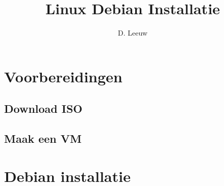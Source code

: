 \documentclass[a4paper,12pt,twoside,openright,titlepage]{article}
\author{D. Leeuw}
\title{Linux Debian Installatie}
\date{\today\\
0.5.1\\
\vfill
\raggedright
\copyright\ 2020-2025 Dennis Leeuw\\
}
\begin{document}

\maketitle


%
%


\section{Voorbereidingen}
\subsection{Download ISO}

\subsection{Maak een VM}


\section{Debian installatie}


\printindex
\end{document}
